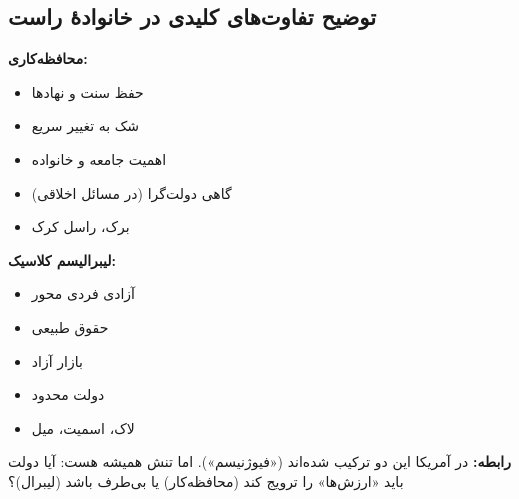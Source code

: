 \subsection*{توضیح تفاوت‌های کلیدی در خانوادهٔ راست}

\begin{tcolorbox}[
    enhanced,
    colback=rightblue!5,
    colframe=rightblue,
    boxrule=1.5pt,
    arc=5pt,
    fonttitle=\bfseries,
    title={\rl{🔵 محافظه‌کاری در برابر لیبرالیسم کلاسیک}}
]

\textbf{محافظه‌کاری:}
\begin{itemize}
    \item حفظ سنت و نهادها
    \item شک به تغییر سریع
    \item اهمیت جامعه و خانواده
    \item گاهی دولت‌گرا (در مسائل اخلاقی)
    \item برک، راسل کرک
\end{itemize}



\textbf{لیبرالیسم کلاسیک:}
\begin{itemize}
    \item آزادی فردی محور
    \item حقوق طبیعی
    \item بازار آزاد
    \item دولت محدود
    \item لاک، اسمیت، میل
\end{itemize}


\textbf{رابطه:} در آمریکا این دو ترکیب شده‌اند («فیوژنیسم»). اما تنش همیشه هست: آیا دولت باید «ارزش‌ها» را ترویج کند (محافظه‌کار) یا بی‌طرف باشد (لیبرال)؟
\end{tcolorbox}

